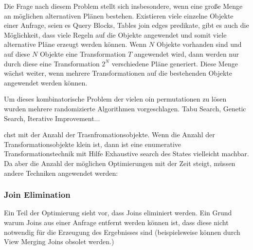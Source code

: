 Die Frage nach diesem Problem stellt sich insbesondere, wenn eine große Menge an möglichen alternativen Plänen bestehen. Existieren viele einzelne Objekte einer Anfrage, seien es Query Blocks, Tables join edges predikate, gibt es auch die Möglichkeit, dass viele Regeln auf die Objekte angewendet und somit viele alternative Pläne erzeugt werden können. Wenn $N$ Objekte vorhanden sind und auf diese $N$ Objekte eine Transformation $T$ angewendet wird, dann werden nur durch diese eine Transformation $2^N$ verschiedene Pläne generiert. Diese  Menge wächst weiter, wenn mehrere Transformationen auf die bestehenden Objekte angewendet werden können. 


Um dieses kombinatorische Problem der vielen oin permutationen zu lösen wurden mehrere randomizierte Algorithmen vorgeschlagen. Tabu Search, Genetic Search, Iterative Improvement...

chst mit der Anzahl der Trasnfromationsobjekte. Wenn die Anzahl der Transformationsobjekte klein ist, dann ist eine enumerative Transformationstechnik mit Hilfe Exhaustive search des States vielleicht machbar. Da aber die Anzahl der möglichen Optimierungen mit der Zeit steigt, müssen andere Techniken angewendet werden:


\subsubsection{Join Elimination}
Ein Teil der Optimierung sieht vor, dass Joins eliminiert werden. Ein Grund warum Joins aus einer Anfrage entfernt werden können ist, dass diese nicht notwendig für die Erzeugung des Ergebnisses sind (beispielsweise können durch View Merging Joins obsolet werden.)



